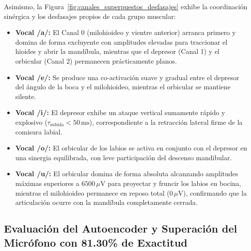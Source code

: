 \documentclass[11pt,a4paper,openany]{book}
\theoremstyle{definition}
\begin{document}
Asimismo, la Figura~\ref{fig:canales_superpuestos_desfasajes} exhibe la coordinación sinérgica y los desfasajes propios de cada grupo muscular:
\begin{itemize}
    \item \textbf{Vocal /a/:} El Canal 0 (milohioideo y vientre anterior) arranca primero y domina de forma excluyente con amplitudes elevadas para traccionar el hioides y abrir la mandíbula, mientras que el depresor (Canal 1) y el orbicular (Canal 2) permanecen prácticamente planos.
    \item \textbf{Vocal /e/:} Se produce una co-activación suave y gradual entre el depresor del ángulo de la boca y el milohioideo, mientras el orbicular se mantiene silente.
    \item \textbf{Vocal /i/:} El depresor exhibe un ataque vertical sumamente rápido y explosivo ($\tau_{\text{subida}} < 50\,\text{ms}$), correspondiente a la retracción lateral firme de la comisura labial.
    \item \textbf{Vocal /o/:} El orbicular de los labios se activa en conjunto con el depresor en una sinergia equilibrada, con leve participación del descenso mandibular.
    \item \textbf{Vocal /u/:} El orbicular domina de forma absoluta alcanzando amplitudes máximas superiores a $6500\,\mu\text{V}$ para proyectar y fruncir los labios en bocina, mientras el milohioideo permanece en reposo total ($0\,\mu\text{V}$), confirmando que la articulación ocurre con la mandíbula completamente cerrada.
\end{itemize}

\subsection{Evaluación del Autoencoder y Superación del Micrófono con 81.30\% de Exactitud}
\label{subsec:evaluacion_autoencoder_gate_doble}
\end{document}
